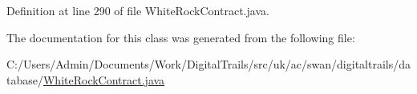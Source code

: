 Definition at line 290 of file White\+Rock\+Contract.\+java.



The documentation for this class was generated from the following file\+:\begin{DoxyCompactItemize}
\item 
C\+:/\+Users/\+Admin/\+Documents/\+Work/\+Digital\+Trails/src/uk/ac/swan/digitaltrails/database/\hyperlink{_white_rock_contract_8java}{White\+Rock\+Contract.\+java}\end{DoxyCompactItemize}
